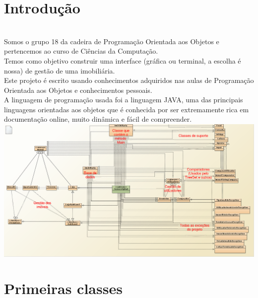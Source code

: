 \documentclass[12pt]{article}
\begin{document}
\maketitle                                            %
\pagebreak

\section{Introdução}
~\\

Somos o grupo 18 da cadeira de Programação Orientada aos Objetos e pertencemos ao curso de Ciências da Computação.
~\\ 

Temos como objetivo construir uma interface (gráfica ou terminal, a escolha é nossa) de gestão de uma imobiliária.
~\\

Este projeto é escrito usando conhecimentos adquiridos nas aulas de Programação Orientada aos Objetos e conhecimentos pessoais.
~\\

A linguagem de programação usada foi a linguagem JAVA, uma das principais linguagens orientadas aos objetos que é conhecida por ser extremamente rica em documentação online, muito dinâmica e fácil de compreender.
~\\


\includegraphics[scale=0.27]{004.png}	
\pagebreak

\section{Primeiras classes}
~\\
\end{document}
